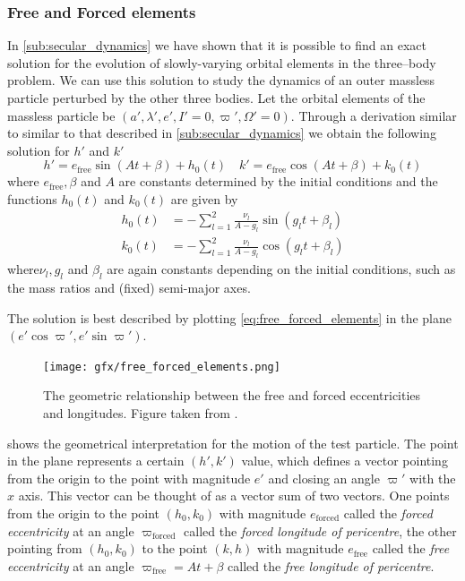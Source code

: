 \documentclass[ twoside,openright,titlepage,numbers=noenddot,headinclude,%
                footinclude=true,cleardoublepage=empty,abstractoff, %
                BCOR=5mm,paper=a4,fontsize=11pt,%
                american,%
                ]{scrreprt}
\begin{document}
\subsubsection*{Free and Forced elements}
In \cref{sub:secular_dynamics} we have shown that it is possible to 
find an exact solution for the evolution of slowly-varying
orbital elements in the three--body problem. We can use this solution
to study the dynamics of an outer massless particle perturbed by 
the other three bodies. Let the orbital elements of the massless
particle be $(a',\lambda',e',I'=0,\varpi',\Omega'=0)$. Through a
derivation similar to similar to that described in 
\cref{sub:secular_dynamics} \citep[see ch. 7 sec. 4 of][]{murray}
we obtain the following solution for $h'$ and $k'$
\begin{equation}
    h'=e_\text{free}\sin(At+\beta)+h_0(t)\quad
     k'=e_\text{free}\cos(At+\beta)+k_0(t)
     \label{eq:free_forced_elements}
\end{equation}
where $e_\text{free},\beta$ and $A$ are constants determined by
the initial conditions and the functions $h_0(t)$ and $k_0(t)$
are given by
\begin{align}
    h_0(t)&=-\sum^2_{l=1} \frac{\nu_l}{A-g_l} \sin(g_lt+\beta_l)\\
    k_0(t)&=-\sum^2_{l=1} \frac{\nu_l}{A-g_l} \cos(g_lt+\beta_l)
\end{align}
where$\nu_l,g_l$ and $\beta_l$ are again constants depending on 
the initial conditions, such as the mass ratios and (fixed)
semi-major axes. 

The solution is best described by plotting
\cref{eq:free_forced_elements} in the plane $(e'\cos\varpi',
e'\sin\varpi')$.
\begin{figure}[htb]
\centering
\texttt{[image: gfx/free\_forced\_elements.png]}
\caption{The geometric relationship between the free and forced
    eccentricities and longitudes. Figure taken from \cite{murray}.}
\label{fig:free_forced_elements}
\end{figure}
 shows the geometrical interpretation
for the motion of the test particle. The point in the plane represents
a certain $(h',k')$ value, which defines a vector pointing from the origin
to the point with magnitude $e'$ and closing an angle $\varpi'$ with
the $x$ axis. This vector can be thought of as a vector sum of two 
vectors. One points from the origin to the point $(h_0, k_0)$ 
with magnitude $e_\text{forced}$ called the \emph{forced eccentricity} 
at an angle $\varpi_\text{forced}$ called the \emph{forced longitude 
of pericentre},  
the other pointing from
$(h_0,k_0)$ to the point $(k,h)$ with magnitude $e_\text{free}$ called
the \emph{free eccentricity} 
at an angle $\varpi_\text{free}=At+\beta$ called the \emph{free
longitude of pericentre}. 
\end{document}
